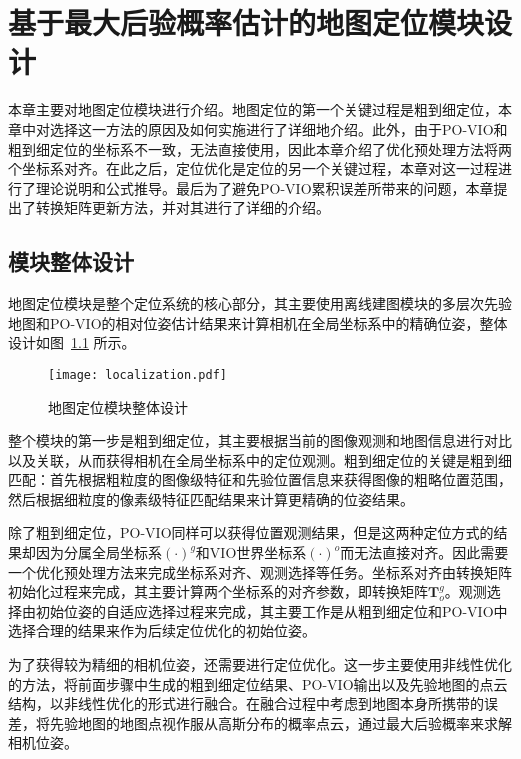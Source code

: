 
\chapter{基于最大后验概率估计的地图定位模块设计}

本章主要对地图定位模块进行介绍。地图定位的第一个关键过程是粗到细定位，本章中对选择这一方法的原因及如何实施进行了详细地介绍。此外，由于PO-VIO和粗到细定位的坐标系不一致，无法直接使用，因此本章介绍了优化预处理方法将两个坐标系对齐。在此之后，定位优化是定位的另一个关键过程，本章对这一过程进行了理论说明和公式推导。最后为了避免PO-VIO累积误差所带来的问题，本章提出了转换矩阵更新方法，并对其进行了详细的介绍。

\section{模块整体设计}

地图定位模块是整个定位系统的核心部分，其主要使用离线建图模块的多层次先验地图和PO-VIO的相对位姿估计结果来计算相机在全局坐标系中的精确位姿，整体设计如图~\ref{fig:localization} 所示。

\begin{figure}
  \centering
  \texttt{[image: localization.pdf]}
  \caption{地图定位模块整体设计}
  \label{fig:localization}
\end{figure}

整个模块的第一步是粗到细定位，其主要根据当前的图像观测和地图信息进行对比以及关联，从而获得相机在全局坐标系中的定位观测。粗到细定位的关键是粗到细匹配：首先根据粗粒度的图像级特征和先验位置信息来获得图像的粗略位置范围，然后根据细粒度的像素级特征匹配结果来计算更精确的位姿结果。

除了粗到细定位，PO-VIO同样可以获得位置观测结果，但是这两种定位方式的结果却因为分属全局坐标系$(\cdot)^{g}$和VIO世界坐标系$(\cdot)^{o}$而无法直接对齐。因此需要一个优化预处理方法来完成坐标系对齐、观测选择等任务。坐标系对齐由转换矩阵初始化过程来完成，其主要计算两个坐标系的对齐参数，即转换矩阵$\symbf{T}_o^{g}$。观测选择由初始位姿的自适应选择过程来完成，其主要工作是从粗到细定位和PO-VIO中选择合理的结果来作为后续定位优化的初始位姿。

为了获得较为精细的相机位姿，还需要进行定位优化。这一步主要使用非线性优化的方法，将前面步骤中生成的粗到细定位结果、PO-VIO输出以及先验地图的点云结构，以非线性优化的形式进行融合。在融合过程中考虑到地图本身所携带的误差，将先验地图的地图点视作服从高斯分布的概率点云，通过最大后验概率来求解相机位姿。

